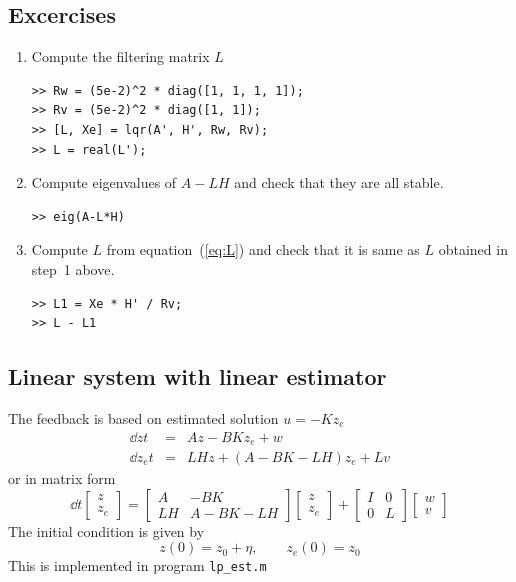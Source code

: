 \documentclass[12pt]{article}
\begin{document}
\subsection{Excercises}

\begin{enumerate}

\item Compute the filtering matrix $L$
\begin{lstlisting}
>> Rw = (5e-2)^2 * diag([1, 1, 1, 1]);
>> Rv = (5e-2)^2 * diag([1, 1]);
>> [L, Xe] = lqr(A', H', Rw, Rv);
>> L = real(L');
\end{lstlisting}

\item Compute eigenvalues of $A-LH$ and check that they are all stable.
\begin{lstlisting}
>> eig(A-L*H)
\end{lstlisting}

\item Compute $L$ from equation~(\ref{eq:L}) and check that it is same as $L$ obtained in step~1 above.
\begin{lstlisting}
>> L1 = Xe * H' / Rv;
>> L - L1
\end{lstlisting}

\end{enumerate}

\subsection{Linear system with linear estimator}
The feedback is based on estimated solution $u = -K z_e$
\begin{eqnarray*}
\dd{z}{t} &=& A z - B K z_e + w \\
\dd{z_e}{t} &=& L H z + (A - B K - L H) z_e + L v
\end{eqnarray*}
or in matrix form
\[
\dd{}{t} \begin{bmatrix}
z \\
z_e \end{bmatrix} = \begin{bmatrix}
A & -B K \\
L H & A - B K - L H \end{bmatrix} \begin{bmatrix}
z \\ z_e \end{bmatrix} + \begin{bmatrix}
I & 0 \\
0 & L \end{bmatrix} \begin{bmatrix}
w \\ v \end{bmatrix}
\]
The initial condition is given by
\[
z(0) = z_0 + \eta, \qquad z_e(0) = z_0
\]
This is implemented in program {\tt lp\_est.m}
\end{document}
